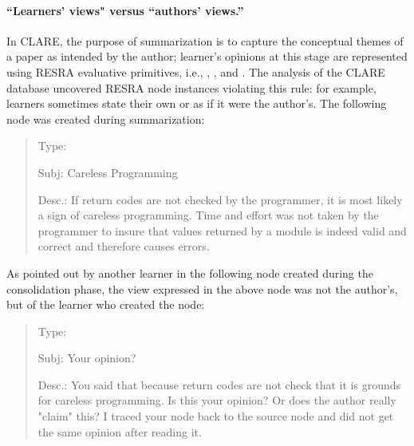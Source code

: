 \paragraph{``Learners' views" versus ``authors' views.''}

In CLARE, the purpose of summarization is to capture the conceptual themes
of a paper as intended by the author; learner's opinions at this stage are
represented using RESRA evaluative primitives, i.e., ,
, and . The analysis of the
CLARE database uncovered RESRA node instances violating this rule: for
example, learners sometimes state their own  or
 as if it were the author's.  The following node was
created during summarization:

\small
\begin{quote}
  \begin{itemizenoindent}

  \item {\sf Type}: 
 
 \item {\sf Subj}: Careless Programming
 
 \item {\sf Desc.}: If return codes are not checked by the
   programmer, it is most likely a sign of careless programming.  Time
   and effort was not taken by the programmer to insure that values
   returned by a module is indeed valid and correct and therefore
   causes errors.

 \end{itemizenoindent}
\end{quote}
\normalsize
{}

As pointed out by another learner in the following node created
during the consolidation phase, the view expressed in the above node was
not the author's, but of the learner who created the node:

 \small
\begin{quote}
  \begin{itemizenoindent}

\item {\sf Type}: 
 
\item {\sf Subj}: Your opinion?
 
\item {\sf Desc.}: You said that because return codes are not check
  that it is grounds for careless programming.  Is this your opinion?
  Or does the author really "claim" this?  I traced your node back to
  the source node and did not get the same opinion after reading it.
 \end{itemizenoindent}
\end{quote}
\normalsize
{}

